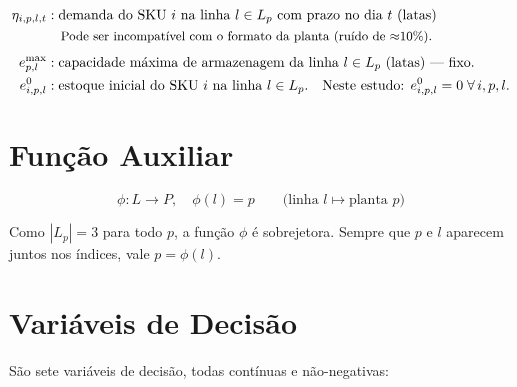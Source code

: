 \documentclass[12pt, a4paper]{article}
\begin{document}
\begin{align*}
  \eta_{i,p,l,t}  &: \text{demanda do SKU } i \text{ na linha } l \in L_p \text{ com prazo no dia } t \text{ (latas)} \\
                   &\quad \text{\small Pode ser incompat\'{i}vel com o formato da planta (ru\'{i}do de $\approx$10\%).} \\[4pt]
  e^{\max}_{p,l}  &: \text{capacidade m\'{a}xima de armazenagem da linha } l \in L_p \text{ (latas) --- fixo.} \\
  e^{0}_{i,p,l}   &: \text{estoque inicial do SKU } i \text{ na linha } l \in L_p. \quad
                      \text{Neste estudo: } e^{0}_{i,p,l} = 0 \;\forall\, i,p,l.
\end{align*}

\section{Fun\c{c}\~{a}o Auxiliar}

\[
  \phi : L \to P, \quad \phi(l) = p \qquad
  \text{(linha } l \mapsto \text{planta } p\text{)}
\]

Como $|L_p| = 3$ para todo $p$, a fun\c{c}\~{a}o $\phi$ \'{e} sobrejetora.
Sempre que $p$ e $l$ aparecem juntos nos \'{i}ndices, vale $p = \phi(l)$.

\section{Vari\'{a}veis de Decis\~{a}o}

S\~{a}o sete vari\'{a}veis de decis\~{a}o, todas cont\'{i}nuas e n\~{a}o-negativas:
\end{document}
